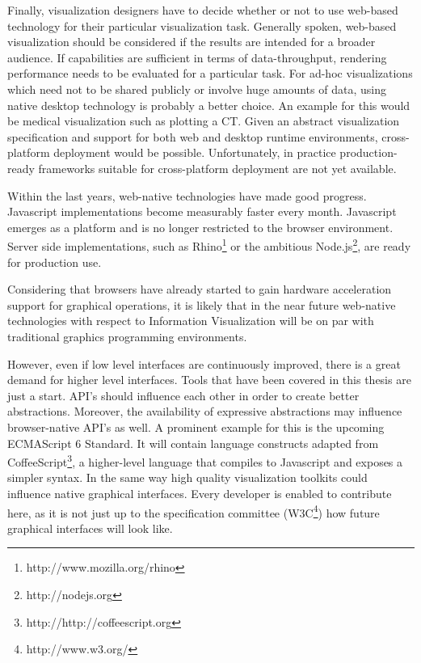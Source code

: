 Finally, visualization designers have to decide whether or not to use web-based technology for their particular visualization task. Generally spoken, web-based visualization should be considered if the results are intended for a broader audience. If capabilities are sufficient in terms of data-throughput, rendering performance needs to be evaluated for a particular task. For ad-hoc visualizations which need not to be shared publicly or involve huge amounts of data, using native desktop technology is probably a better choice. An example for this would be medical visualization such as plotting a CT. Given an abstract visualization specification and support for both web and desktop runtime environments, cross-platform deployment would be possible. Unfortunately, in practice production-ready frameworks suitable for cross-platform deployment are not yet available.

\SuperPar Within the last years, web-native technologies have made good progress. Javascript implementations become measurably faster every month. Javascript emerges as a platform and is no longer restricted to the browser environment. Server side implementations, such as Rhino\footnote{http://www.mozilla.org/rhino} or the ambitious Node.js\footnote{http://nodejs.org}, are ready for production use.

Considering that browsers have already started to gain hardware acceleration support for graphical operations, it is likely that in the near future web-native technologies with respect to Information Visualization will be on par with traditional graphics programming environments.

However, even if low level interfaces are continuously improved, there is a great demand for higher level interfaces. Tools that have been covered in this thesis are just a start. API's should influence each other in order to create better abstractions. Moreover, the availability of expressive abstractions may influence browser-native API's as well. A prominent example for this is the upcoming ECMAScript 6 Standard. It will contain language constructs adapted from CoffeeScript\footnote{http://http://coffeescript.org}, a higher-level language that compiles to Javascript and exposes a simpler syntax. In the same way high quality visualization toolkits could influence native graphical interfaces. Every developer is enabled to contribute here, as it is not just up to the specification committee (W3C\footnote{http://www.w3.org/}) how future graphical interfaces will look like.